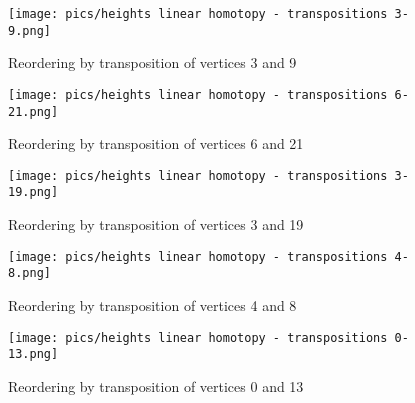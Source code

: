 \documentclass{article}
\begin{document}
\begin{figure}[htbp]
    \centering
    \texttt{[image: pics/heights linear homotopy - transpositions 3-9.png]}
    \caption{Reordering by transposition of vertices 3 and 9}
    \label{fig:transposition3and9}
\end{figure}
\begin{figure}[htbp]
    \centering
    \texttt{[image: pics/heights linear homotopy - transpositions 6-21.png]}
    \caption{Reordering by transposition of vertices 6 and 21}
    \label{fig:transposition6and21}
\end{figure}
\begin{figure}[htbp]
    \centering
    \texttt{[image: pics/heights linear homotopy - transpositions 3-19.png]}
    \caption{Reordering by transposition of vertices 3 and 19}
    \label{fig:transposition3and19}
\end{figure}
\begin{figure}[htbp]
    \centering
    \texttt{[image: pics/heights linear homotopy - transpositions 4-8.png]}
    \caption{Reordering by transposition of vertices 4 and 8}
    \label{fig:transposition4and8}
\end{figure}
\begin{figure}[htbp]
    \centering
    \texttt{[image: pics/heights linear homotopy - transpositions 0-13.png]}
    \caption{Reordering by transposition of vertices 0 and 13}
    \label{fig:transposition0and13}
\end{figure}
\end{document}
